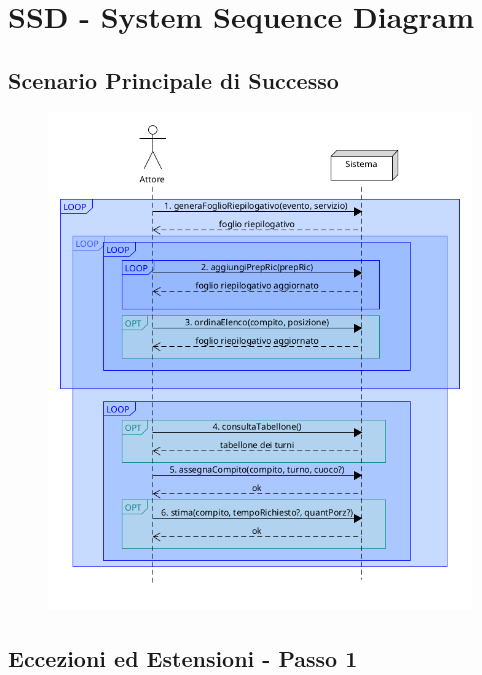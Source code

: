\chapter{SSD - System Sequence Diagram}

\section{Scenario Principale di Successo}

\begin{figure}[h]
  \begin{center}
    \includegraphics[scale = 0.47]{images/SSD/SSD - Scenario principale.png}
  \end{center}
\end{figure}

\section{Eccezioni ed Estensioni - Passo 1}

